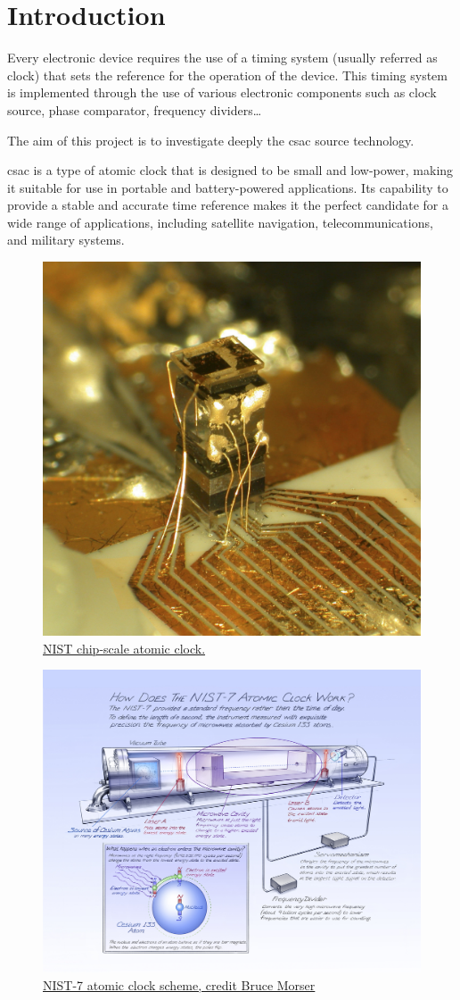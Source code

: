 \section{Introduction}
\label{sec:introduction}

Every electronic device requires the use of a timing system (usually referred as clock) that sets the reference for the operation of the device.
This timing system is implemented through the use of various electronic components such as clock source, phase comparator, frequency dividers\dots

The aim of this project is to investigate deeply the \acrfull{csac} source technology.

\acrshort{csac} is a type of atomic clock that is designed to be small and low-power, making it suitable for use in portable and battery-powered applications.
Its capability to provide a stable and accurate time reference makes it the perfect candidate for a wide range of applications, including satellite navigation, telecommunications, and military systems.

\begin{figure}[H]
    \centering
    \includegraphics[width=.5\textwidth]{img/first_atomic_clock}
    \caption{\href{https://www.nist.gov/news-events/news/2004/08/nist-unveils-chip-scale-atomic-clock}{NIST chip-scale atomic clock.}}
\end{figure}

\begin{figure}[H]
    \centering
    \includegraphics[width=.8\textwidth]{img/cesium_atomic_clock_scheme}
    \caption{\href{https://timeandnavigation.si.edu/multimedia-asset/how-does-the-nist-7-atomic-clock-work}{NIST-7 atomic clock scheme, credit Bruce Morser}}
\end{figure}
